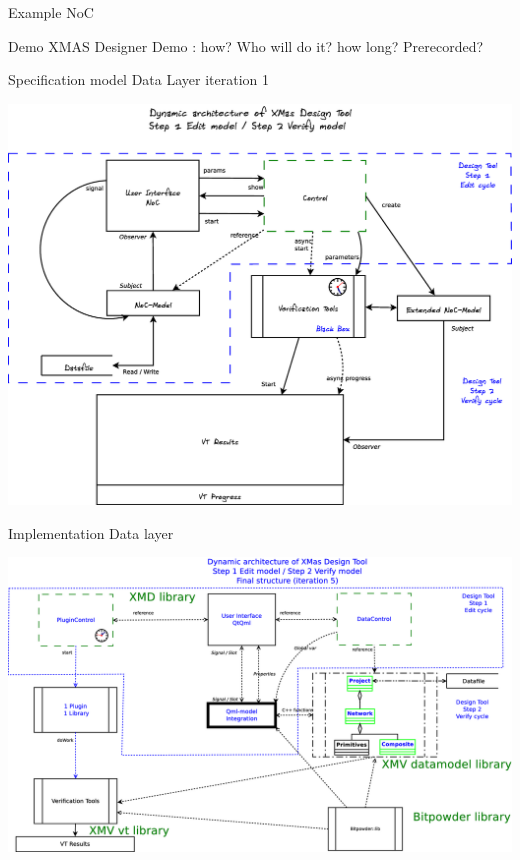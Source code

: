 \documentclass[11pt]{beamer}
\begin{document}
\begin{frame}{Example NoC}

\end{frame}

\begin{frame}{Demo XMAS Designer}
	Demo : how? Who will do it? how long? Prerecorded?
\end{frame}

\begin{frame}{Specification model Data Layer iteration 1}

	\includegraphics[width=.80\linewidth]{pictures/1c-architecture-dynamic-1}

\end{frame}

\begin{frame}{Implementation Data layer}

	\includegraphics[width=.90\linewidth]{pictures/1c-architecture-dynamic-2}

\end{frame}
\end{document}
